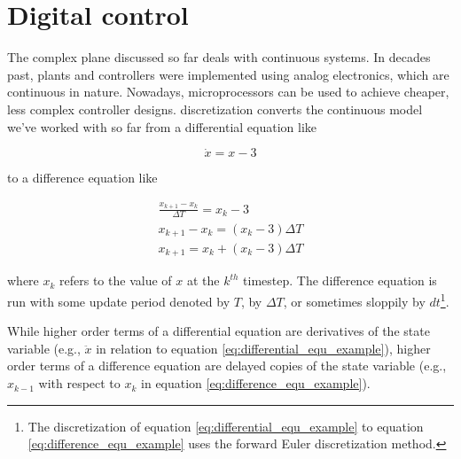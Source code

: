 
\chapter{Digital control} \label{ch:digital_control}

The complex plane discussed so far deals with continuous \glspl{system}. In
decades past, \glspl{plant} and controllers were implemented using analog
electronics, which are continuous in nature. Nowadays, microprocessors can be
used to achieve cheaper, less complex controller designs. \Gls{discretization}
converts the continuous \gls{model} we've worked with so far from a differential
equation like

\begin{equation}
  \dot{x} = x - 3 \label{eq:differential_equ_example}
\end{equation}

to a difference equation like

\begin{align}
  \frac{x_{k+1} - x_k}{\Delta T} = x_k - 3 \nonumber \\
  x_{k+1} - x_k = (x_k - 3) \Delta T \nonumber \\
  x_{k+1} = x_k + (x_k - 3) \Delta T \label{eq:difference_equ_example}
\end{align}

where $x_k$ refers to the value of $x$ at the $k^{th}$ timestep. The difference
equation is run with some update period denoted by $T$, by $\Delta T$, or
sometimes sloppily by $dt$\footnote{The discretization of equation
\eqref{eq:differential_equ_example} to equation
\eqref{eq:difference_equ_example} uses the forward Euler discretization
method.}.

While higher order terms of a differential equation are derivatives of the
\gls{state} variable (e.g., $\ddot{x}$ in relation to equation
\eqref{eq:differential_equ_example}), higher order terms of a difference
equation are delayed copies of the \gls{state} variable (e.g., $x_{k-1}$ with
respect to $x_k$ in equation \eqref{eq:difference_equ_example}).

\renewcommand*{\chapterpath}{\partpath/digital-control}







